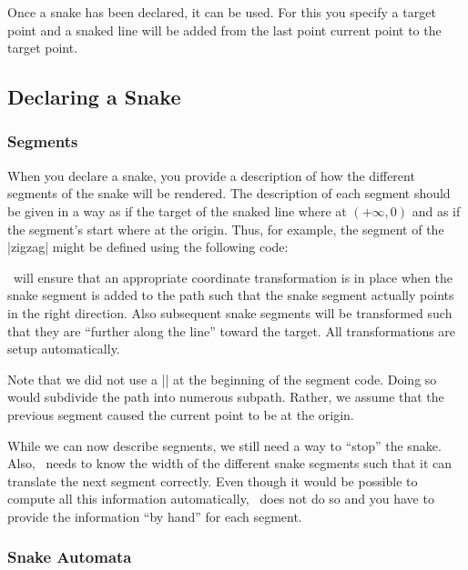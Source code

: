 Once a snake has been declared, it can be used. For this you specify a
target point and a snaked line will be added from the last point
current point to the target point.


\subsection{Declaring a Snake}


\subsubsection{Segments}

When you declare a snake, you provide a description of how the
different segments of the snake will be rendered. The description of
each segment should be given in a way as if the target of the snaked
line where at $(+\infty,0)$ and as if the segment's start where at the
origin. Thus, for example, the segment of the |zigzag| might be
defined using the following code: 
\begin{codeexample}
\pgfpathlineto{\pgfpoint{5pt}{5pt}}
\pgfpathlineto{\pgfpoint{15pt}{-5pt}}
\pgfpathlineto{\pgfpoint{20pt}{0pt}}
\end{codeexample}

\pgfname\ will ensure that an appropriate coordinate transformation
is in place when the snake segment is added to the path such that
the snake segment actually points in the right direction. Also
subsequent snake segments will be transformed such that they are
``further along the line'' toward the target. All transformations
are setup automatically.

Note that we did not use a |\pgfpathmoveto{\pgfpointorigin}| at the
beginning of the segment code. Doing so would subdivide the path into
numerous subpath. Rather, we assume that the previous segment caused
the current point to be at the origin.

While we can now describe segments, we still need a way to ``stop''
the snake. Also, \pgfname\ needs to know the width of the different
snake segments such that it can translate the next segment correctly.
Even though it would be possible to compute all this information
automatically, \pgfname\ does not do so and you have to provide the
information ``by hand'' for each segment. 


\subsubsection{Snake Automata}

